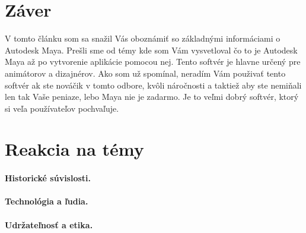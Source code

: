 \documentclass[10pt,oneside,slovak,a4paper]{article}
\begin{document}
\section{Záver} \label{zaver}

V tomto článku som sa snažil Vás oboznámiť so základnými informáciami o Autodesk Maya. Prešli sme od témy kde som Vám vysvetloval čo to je Autodesk Maya až po vytvorenie aplikácie pomocou nej. Tento softvér je hlavne určený pre animátorov a dizajnérov. Ako som už spomínal, neradím Vám použivať tento softvér ak ste nováčik v tomto odbore, kvôli náročnosti a taktiež aby ste nemiňali len tak Vaše peniaze, lebo Maya nie je zadarmo. Je to veľmi dobrý softvér, ktorý si veľa používateľov pochvaľuje. 


\section{Reakcia na témy} \label{reakcia}


\paragraph{Historické súvislosti.}


\paragraph{Technológia a ľudia.}


\paragraph{Udržateľnosť a etika.}



 
\end{document}
